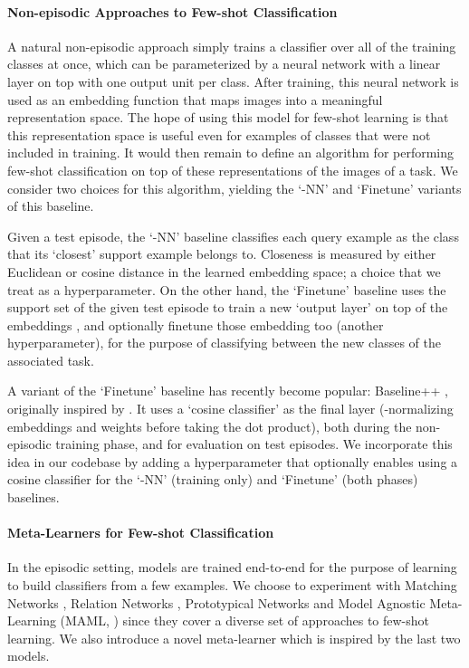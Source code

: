 \documentclass{article} \usepackage{iclr2020_conference,times}
\begin{document}
\paragraph{Non-episodic Approaches to Few-shot Classification} A natural non-episodic approach simply 
trains a classifier over all of the training classes  at once, which
can be parameterized by a neural network with a linear layer on top with one output unit per class.
After training, this neural network is used as an embedding function  that maps images into
a meaningful representation space. The hope of using this model for few-shot learning is that
this representation space is useful even for examples of classes that were not included in training.
It would then remain to define an algorithm for performing few-shot classification on top of these
representations of the images of a task. We consider two choices for this algorithm, yielding 
the `-NN' and `Finetune' variants of this baseline.

Given a test episode, the `-NN' baseline classifies each query example as the class that its `closest' support example belongs to. Closeness is measured by either Euclidean or cosine distance in the 
learned embedding space; a choice that we treat as a hyperparameter. On the other hand, the 
`Finetune' baseline uses the support set of the given test episode to train a new `output
layer' on top of the embeddings , and optionally finetune those embedding too (another hyperparameter), for the purpose of classifying between the  new classes of the associated task. 

A variant of the `Finetune' baseline has recently become popular:
Baseline++ \citep{chen2019closer}, originally inspired by \citet{GidarisS2018,qi2018low}.
It uses a `cosine classifier' as the final layer
(-normalizing embeddings and weights before taking the dot product),
both during the non-episodic training phase, and for evaluation on test episodes.
We incorporate this idea in our codebase by adding a hyperparameter that optionally enables using a cosine classifier for the `-NN' (training only) and `Finetune' (both phases) baselines.

\paragraph{Meta-Learners for Few-shot Classification} In the episodic setting,
models are trained end-to-end for the purpose of learning to build classifiers
from a few examples. We choose to experiment with Matching Networks
\citep{vinyals2016matching}, Relation Networks \citep{sung2018learning},
Prototypical Networks \citep{snell2017prototypical} and Model Agnostic
Meta-Learning (MAML, \citealp{finn2017model}) since they cover a diverse set of
approaches to few-shot learning. We also introduce a novel meta-learner which
is inspired by the last two models.
\end{document}
